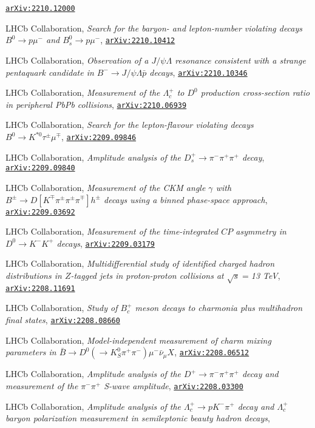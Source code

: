 \documentclass[a4paper, 11pt]{article}
\newenvironment{cvcontent}{
  \leftskip=0.5cm\rightskip=0cm
  \noindent\ignorespaces}{\par}
\newcommand{\arxiv}[1]{\href{https://arxiv.org/abs/#1}{\texttt{arXiv:#1}}}
\begin{document}
\begin{cvcontent}
\begin{enumerate}[label={[\arabic*]}, leftmargin=1.5cm]
    \arxiv{2210.12000}
    \item LHCb Collaboration,
    \emph{Search for the baryon- and lepton-number violating decays $B^0\to p\mu^-$ and $B^0_s\to p\mu^-$},
    \arxiv{2210.10412}
    \item LHCb Collaboration,
    \emph{Observation of a $J/\psi\Lambda$ resonance consistent with a strange pentaquark candidate in $B^-\to J/\psi\Lambda\bar{p}$ decays},
    \arxiv{2210.10346}
    \item LHCb Collaboration,
    \emph{Measurement of the $\Lambda_c^+$ to $D^0$ production cross-section ratio in peripheral PbPb collisions},
    \arxiv{2210.06939}
    \sloppy
    \item LHCb Collaboration,
    \emph{Search for the lepton-flavour violating decays $B^0 \to K^{*0} \tau^\pm \mu^\mp$},
    \arxiv{2209.09846}
    \item LHCb Collaboration,
    \emph{Amplitude analysis of the $D_s^+ \to \pi^- \pi^+ \pi^+$ decay},
    \arxiv{2209.09840}
    \item LHCb Collaboration,
    \emph{Measurement of the CKM angle $\gamma$ with $ B^\pm \to D \left [ K^\mp \pi^\pm \pi^\pm \pi^\mp \right ] h^\pm$ decays using a binned phase-space approach},
    \arxiv{2209.03692}
    \item LHCb Collaboration,
    \emph{Measurement of the time-integrated $CP$ asymmetry in $D^0\to K^- K^+$ decays},
    \arxiv{2209.03179}
    \item LHCb Collaboration,
    \emph{Multidifferential study of identified charged hadron distributions in $Z$-tagged jets in proton-proton collisions at $\sqrt{s}=$13 TeV},
    \arxiv{2208.11691}
    \item LHCb Collaboration,
    \emph{Study of $B_c^+$ meson decays to charmonia plus multihadron final states},
    \arxiv{2208.08660}
    \item LHCb Collaboration,
    \emph{Model-independent measurement of charm mixing parameters in $\bar{B} \rightarrow D^0 ( \rightarrow K_S^0 \pi^+ \pi^-) \mu^- \bar{\nu}_\mu X$},
    \arxiv{2208.06512}
    \item LHCb Collaboration,
    \emph{Amplitude analysis of the $D^+\to\pi^- \pi^+\pi^+$ decay and measurement of the $\pi^-\pi^+$ S-wave amplitude},
    \arxiv{2208.03300}
    \item LHCb Collaboration,
    \emph{Amplitude analysis of the $\Lambda^+_c\to pK^-\pi^+$ decay and $\Lambda^+_c$ baryon polarization measurement in semileptonic beauty hadron decays},

\end{enumerate}
\end{cvcontent}
\end{document}
